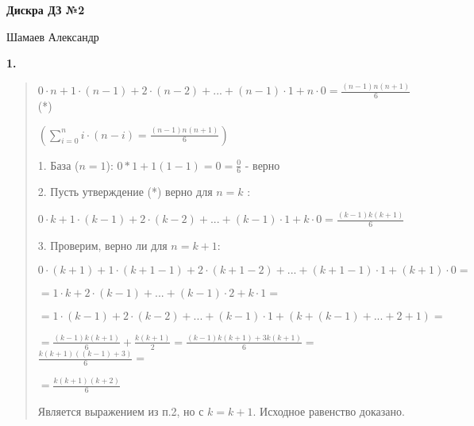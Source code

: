 \documentclass{article}
\begin{document}
\setlength{\parindent}{0pt}
\begin{Large}
    \textsf{\textbf{Дискра ДЗ №2}}
    
    Шамаев Александр    
\end{Large}
\vspace{1cm}



\textsf{\textbf{1.}}
\begin{quote}


\begin{center}
$0 \cdot n + 1 \cdot (n - 1) + 2 \cdot (n - 2) + ... +
(n - 1) \cdot 1 + n \cdot 0 = \frac{(n-1)n(n+1)}{6}$ (*)

$(\sum_{i = 0}^{n} i \cdot (n - i) = \frac{(n-1)n(n+1)}{6})$ 
\end{center}

1. База ($n = 1$): $ 0 * 1 + 1(1-1) = 0 = \frac{0}{6}$ - верно

2. Пусть утверждение (*) верно для $n=k$ : 

\begin{center}
$0 \cdot k + 1 \cdot (k - 1) + 2 \cdot (k - 2) + ... +
(k - 1) \cdot 1 + k \cdot 0 = \frac{(k-1)k(k+1)}{6}$
\end{center}

3. Проверим, верно ли для $n = k + 1$:

\begin{center}

$0 \cdot (k + 1)+ 1 \cdot (k + 1 - 1) + 2 \cdot (k + 1 - 2) + ... +
(k + 1 - 1) \cdot 1 + (k + 1) \cdot 0 = $

$= 1 \cdot k + 2 \cdot (k - 1) + ... + (k - 1) \cdot 2 +
k \cdot 1 = $


$ = 1 \cdot (k - 1) + 2 \cdot (k - 2) + ... +
(k - 1) \cdot 1 + (k + (k - 1) + ... + 2 + 1) = $

$= \frac{(k-1)k(k+1)}{6} + \frac{k(k + 1)}{2} = \frac{(k - 1)k(k+1) + 3k(k+1)}{6}=$
$ \frac{k(k+1)((k-1) + 3)}{6} = $

$= \frac{k(k+1)(k + 2)}{6}$ 
\end{center}

Является выражением из п.2, но с $k = k + 1$. Исходное равенство доказано.
\end{quote}
\end{document}
